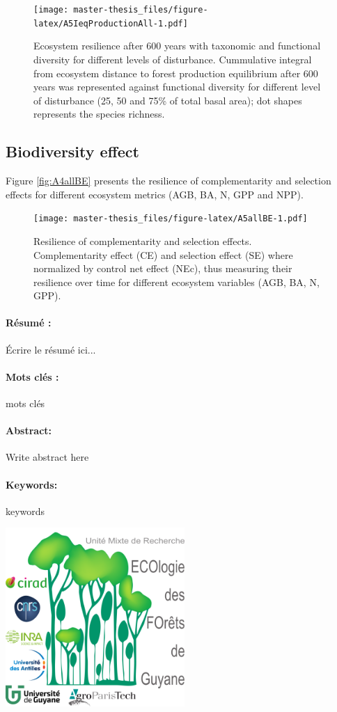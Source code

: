 \documentclass[12pt,]{article}
\theoremstyle{definition}
\theoremstyle{definition}
\theoremstyle{remark}
\begin{document}
\begin{figure}[htbp]
\centering
\texttt{[image: master-thesis\_files/figure-latex/A5IeqProductionAll-1.pdf]}
\caption{\label{fig:A5IeqProductionAll}Ecosystem resilience after 600 years
with taxonomic and functional diversity for different levels of
disturbance. Cummulative integral from ecosystem distance to forest
production equilibrium after 600 years was represented against
functional diversity \citep[FRIC, FEve, FDiv, and
FDis,][]{villeger_new_2008} for different level of disturbance (25, 50
and 75\% of total basal area); dot shapes represents the species
richness.}
\end{figure}

\subsection{Biodiversity effect}\label{biodiversity-effect-2}

Figure \ref{fig:A4allBE} presents the resilience of complementarity and
selection effects for different ecosystem metrics (AGB, BA, N, GPP and
NPP).

\begin{figure}[htbp]
\centering
\texttt{[image: master-thesis\_files/figure-latex/A5allBE-1.pdf]}
\caption{\label{fig:A5allBE}Resilience of complementarity and selection
effects. Complementarity effect (CE) and selection effect (SE) where
normalized by control net effect (NEc), thus measuring their resilience
over time for different ecosystem variables (AGB, BA, N, GPP).}
\end{figure}


\listoftables
\listoffigures

  \newpage
  \paragraph{Résumé :}
  Écrire le résumé ici...
  \paragraph{Mots clés :} mots clés
  \newline\newline
  \paragraph{Abstract:}
  Write abstract here
  \paragraph{Keywords:} keywords
  
  \vspace*{\fill}
  \includegraphics{images/logo}
\end{document}
